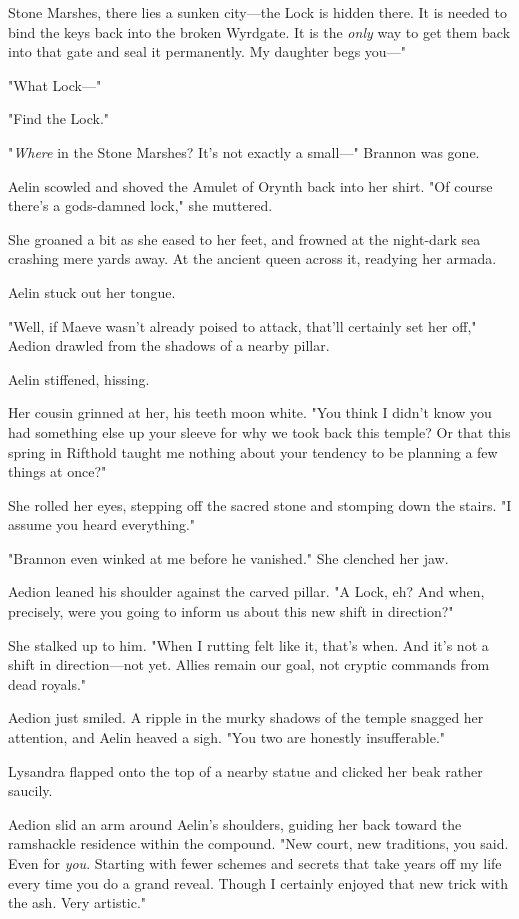 Stone Marshes, there lies a sunken city---the Lock is hidden there. It is needed to bind the keys back into the broken Wyrdgate. It is the
\emph{only} way to get them back into that gate and seal it permanently. My daughter begs you---"

"What Lock---"

"Find the Lock."

"\emph{Where} in the Stone Marshes? It's not exactly a small---" Brannon was gone.

Aelin scowled and shoved the Amulet of Orynth back into her shirt. "Of course there's a gods-damned lock," she muttered.

She groaned a bit as she eased to her feet, and frowned at the night-dark sea crashing mere yards away. At the ancient queen across it, readying her armada.

Aelin stuck out her tongue.

"Well, if Maeve wasn't already poised to attack, that'll certainly set her off," Aedion drawled from the shadows of a nearby pillar.

Aelin stiffened, hissing.

Her cousin grinned at her, his teeth moon white. "You think I didn't know you had something else up your sleeve for why we took back this temple? Or that this spring in Rifthold taught me nothing about your tendency to be planning a few things at once?"

She rolled her eyes, stepping off the sacred stone and stomping down the stairs. "I assume you heard everything."

"Brannon even winked at me before he vanished." She clenched her jaw.

Aedion leaned his shoulder against the carved pillar. "A Lock, eh? And when, precisely, were you going to inform us about this new shift in direction?"

She stalked up to him. "When I rutting felt like it, that's when. And it's not a shift in direction---not yet. Allies remain our goal, not cryptic commands from dead royals."

Aedion just smiled. A ripple in the murky shadows of the temple snagged her attention, and Aelin heaved a sigh. "You two are honestly insufferable."

Lysandra flapped onto the top of a nearby statue and clicked her beak rather saucily.

Aedion slid an arm around Aelin's shoulders, guiding her back toward the ramshackle residence within the compound. "New court, new traditions, you said. Even for \emph{you}. Starting with fewer schemes and secrets that take years off my life every time you do a grand reveal. Though I certainly enjoyed that new trick with the ash. Very artistic."

